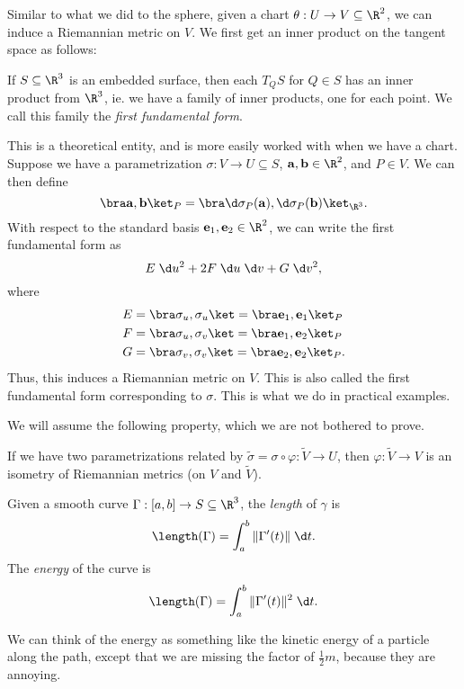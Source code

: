 \documentclass[a4paper]{article}
\begin{document}
Similar to what we did to the sphere, given a chart $\theta: U \to V \subseteq \R^2$, we can induce a Riemannian metric on $V$. We first get an inner product on the tangent space as follows:
\begin{defi}
  If $S \subseteq \R^3$ is an embedded surface, then each $T_Q S$ for $Q \in S$ has an inner product from $\R^3$, ie. we have a family of inner products, one for each point. We call this family the \emph{first fundamental form}.
\end{defi}
This is a theoretical entity, and is more easily worked with when we have a chart. Suppose we have a parametrization $\sigma: V \to U \subseteq S$, $\mathbf{a}, \mathbf{b} \in \R^2$, and $P \in V$. We can then define
\[
  \bra \mathbf{a}, \mathbf{b} \ket_P = \bra \d \sigma_P (\mathbf{a}), \d \sigma_P(\mathbf{b})\ket_{\R^3}.
\]
With respect to the standard basis $\mathbf{e}_1, \mathbf{e}_2 \in \R^2$, we can write the first fundamental form as
\[
  E \;\d u^2 + 2F\;\d u\;\d v + G \;\d v^2,
\]
where
\begin{align*}
  E &= \bra \sigma_u, \sigma_u\ket = \bra \mathbf{e}_1, \mathbf{e}_1\ket_P\\
  F &= \bra \sigma_u, \sigma_v\ket = \bra \mathbf{e}_1, \mathbf{e}_2\ket_P\\
  G &= \bra \sigma_v, \sigma_v\ket = \bra \mathbf{e}_2, \mathbf{e}_2\ket_P.
\end{align*}
Thus, this induces a Riemannian metric on $V$. This is also called the first fundamental form corresponding to $\sigma$. This is what we do in practical examples.

We will assume the following property, which we are not bothered to prove.
\begin{prop}
  If we have two parametrizations related by $\tilde{\sigma} = \sigma \circ \varphi: \tilde{V} \to U$, then $\varphi: \tilde{V} \to V$ is an isometry of Riemannian metrics (on $V$ and $\tilde{V}$).
\end{prop}

\begin{defi}
  Given a smooth curve $\Gamma: [a, b] \to S \subseteq \R^3$, the \emph{length} of $\gamma$ is
  \[
    \length(\Gamma) = \int_a^b \|\Gamma'(t)\| \;\d t.
  \]
  The \emph{energy} of the curve is
  \[
    \length(\Gamma) = \int_a^b \|\Gamma'(t)\|^2 \;\d t.
  \]
\end{defi}
We can think of the energy as something like the kinetic energy of a particle along the path, except that we are missing the factor of $\frac{1}{2}m$, because they are annoying.
\end{document}
